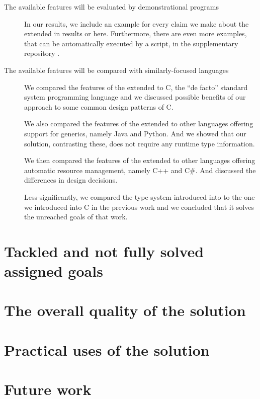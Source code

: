 \begin{description}
    \item[The available features will be evaluated by demonstrational programs] In our results, we include an example for every claim we make about the extended \cmm{} in results or here. Furthermore, there are even more examples, that can be automatically executed by a script, in the supplementary repository \cite{klepl2022compiler}.

    \item[The available features will be compared with similarly-focused languages] We compared the features of the extended \cmm{} to C, the ``de facto'' standard system programming language and we discussed possible benefits of our approach to some common design patterns of C.

    We also compared the features of the extended \cmm{} to other languages offering support for generics, namely Java and Python. And we showed that our solution, contrasting these, does not require any runtime type information.

    We then compared the features of the extended \cmm{} to other languages offering automatic resource management, namely C++ and C\#. And discussed the differences in design decisions.

    Less-significantly, we compared the type system introduced into \cmm{} to the one we introduced into C in the previous work and we concluded that it solves the unreached goals of that work.
\end{description}

\section*{Tackled and not fully solved assigned goals}


\section*{The overall quality of the solution}


\section*{Practical uses of the solution}


\section*{Future work}

